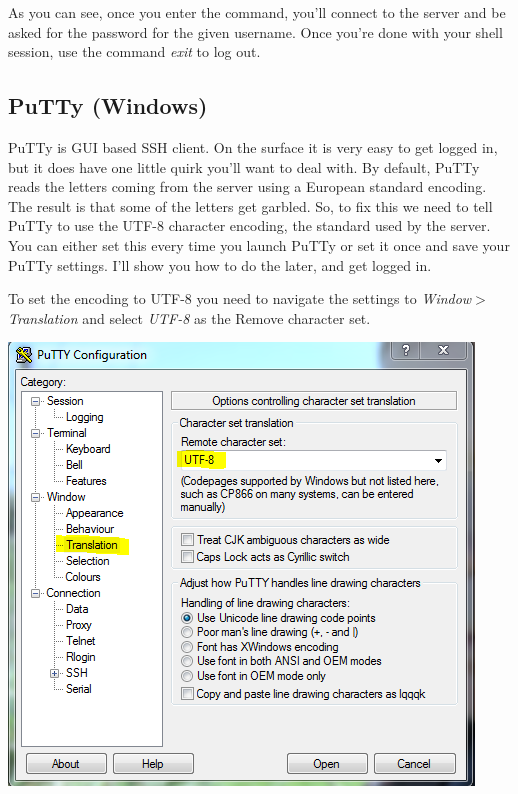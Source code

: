 \documentclass[]{tufte-handout}
\begin{document}
As you can see, once you enter the command, you'll connect to the server and be asked for the password for the given username. Once you're done with your shell session, use the command \textit{exit} to log out. 

\subsection{PuTTy (Windows)}

PuTTy is  GUI based SSH client.  On the surface it is very easy to get logged in, but it does have one little quirk you'll want to deal with. By default, PuTTy reads the letters coming from the server using a European standard encoding.  The result is that some of the letters get garbled. So, to fix this we need to tell PuTTy to use the UTF-8 character encoding, the standard used by the server.  You can either set this every time you launch PuTTy or set it once and save your PuTTy settings. I'll show you how to do the later, and get logged in.  

To set the encoding to UTF-8 you need to navigate the settings to \textit{Window$>$Translation} and select \textit{UTF-8} as the Remove character set.

\vspace{.1in}
\begin{center}
\includegraphics[scale=.75]{Putty-SetUTF8.png}
\end{center}
\vspace{.1in}
\end{document}
